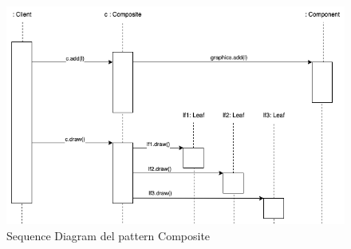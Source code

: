 \begin{figure}[H]
    \centering
    \includegraphics[width=1\linewidth]{assets/pattern/composite/composite-sequence.drawio.png}
    \caption{Sequence Diagram del pattern Composite}
\end{figure}

\newpage